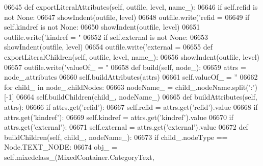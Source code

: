 \begin{DoxyCode}
{{{{{{{{{{{{{{{{{{{{{{{{{{{{{{{{{{{{{{{{{{{{{{{{{{{{{{{{{{{{{{{{{{{{{{{{{{{{{{{{{{{{{{{{{{{{{{{{{{{{{{{{{{{{{{{{{{{{{{{{{{{{{{{{{{{{{{{{{{{{{{{{{{{{{{{{{{{{{{{{{{{{{{{{{{{{{{{{{{{{{{{{{{{{{{{{{{{{{{{{{{{{{{{{{{{{{{{{{{{{{{{{{{{{{{{{{{{{{{{{{{{{{{{{{{{{{{{{{{{{{{{{{{{{{{{{{{{{{{{{{{{{{{{{{{{{{{{{{{{{{{{{{{{{{{{{{{{{{{{{{{{{{{{{{{{{{{{{{{{{{{{{{{{{{{{{{{{{{{{{{{{{{{{{{{{{{{{{{{{{{{{{{{{{{{{{{{{{{{{{{{{{{{{{{{06645     \textcolor{keyword}{def }exportLiteralAttributes(self, outfile, level, name\_):
06646         \textcolor{keywordflow}{if} self.refid \textcolor{keywordflow}{is} \textcolor{keywordflow}{not} \textcolor{keywordtype}{None}:
06647             showIndent(outfile, level)
06648             outfile.write(\textcolor{stringliteral}{'refid = %
06649         \textcolor{keywordflow}{if} self.kindref \textcolor{keywordflow}{is} \textcolor{keywordflow}{not} \textcolor{keywordtype}{None}:
06650             showIndent(outfile, level)
06651             outfile.write(\textcolor{stringliteral}{'kindref = "%
06652         \textcolor{keywordflow}{if} self.external \textcolor{keywordflow}{is} \textcolor{keywordflow}{not} \textcolor{keywordtype}{None}:
06653             showIndent(outfile, level)
06654             outfile.write(\textcolor{stringliteral}{'external = %
06655     \textcolor{keyword}{def }exportLiteralChildren(self, outfile, level, name\_):
06656         showIndent(outfile, level)
06657         outfile.write(\textcolor{stringliteral}{'valueOf\_ = "%
06658     \textcolor{keyword}{def }build(self, node\_):
06659         attrs = node\_.attributes
06660         self.buildAttributes(attrs)
06661         self.valueOf_ = \textcolor{stringliteral}{''}
06662         \textcolor{keywordflow}{for} child\_ \textcolor{keywordflow}{in} node\_.childNodes:
06663             nodeName\_ = child\_.nodeName.split(\textcolor{stringliteral}{':'})[-1]
06664             self.buildChildren(child\_, nodeName\_)
06665     \textcolor{keyword}{def }buildAttributes(self, attrs):
06666         \textcolor{keywordflow}{if} attrs.get(\textcolor{stringliteral}{'refid'}):
06667             self.refid = attrs.get(\textcolor{stringliteral}{'refid'}).value
06668         \textcolor{keywordflow}{if} attrs.get(\textcolor{stringliteral}{'kindref'}):
06669             self.kindref = attrs.get(\textcolor{stringliteral}{'kindref'}).value
06670         \textcolor{keywordflow}{if} attrs.get(\textcolor{stringliteral}{'external'}):
06671             self.external = attrs.get(\textcolor{stringliteral}{'external'}).value
06672     \textcolor{keyword}{def }buildChildren(self, child\_, nodeName\_):
06673         \textcolor{keywordflow}{if} child\_.nodeType == Node.TEXT\_NODE:
06674             obj\_ = self.mixedclass_(MixedContainer.CategoryText,
}}}}}}}}}}}}}}}}}}}}}}}}}}}}}}}}}}}}}}}}}}}}}}}}}}}}}}}}}}}}}}}}}}}}}}}}}}}}}}}}}}}}}}}}}}}}}}}}}}}}}}}}}}}}}}}}}}}}}}}}}}}}}}}}}}}}}}}}}}}}}}}}}}}}}}}}}}}}}}}}}}}}}}}}}}}}}}}}}}}}}}}}}}}}}}}}}}}}}}}}}}}}}}}}}}}}}}}}}}}}}}}}}}}}}}}}}}}}}}}}}}}}}}}}}}}}}}}}}}}}}}}}}}}}}}}}}}}}}}}}}}}}}}}}}}}}}}}}}}}}}}}}}}}}}}}}}}}}}}}}}}}}}}}}}}}}}}}}}}}}}}}}}}}}}}}}}}}}}}}}}}}}}}}}}}}}}}}}}}}}}}}}}}}}}}}}}}}}}}}}}}}}}}}}}}}}}}
\end{DoxyCode}
